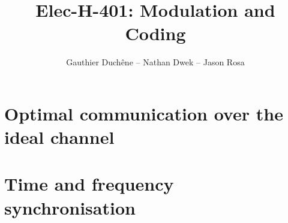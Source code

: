

\title{Elec-H-401: Modulation and Coding}
\author{Gauthier Duchêne -- Nathan Dwek -- Jason Rosa}
\date{}


\maketitle
\tableofcontents
\clearpage
\hypersetup{allcolors = link}

\section{Optimal communication over the ideal channel}


\section{Time and frequency synchronisation}






